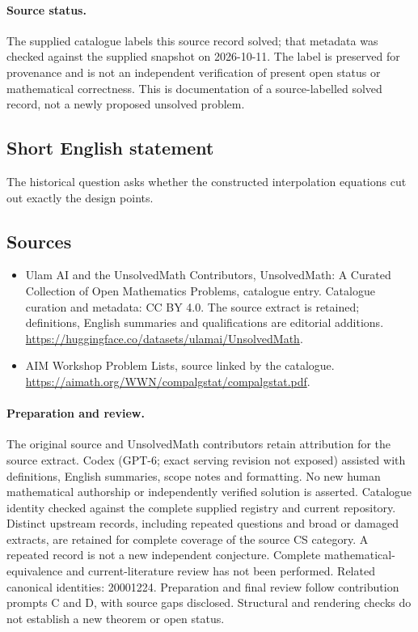 \documentclass[11pt]{article}
\begin{document}
\paragraph{Source status.}
The supplied catalogue labels this source record solved; that metadata was checked against the supplied snapshot on 2026-10-11. The label is preserved for provenance and is not an independent verification of present open status or mathematical correctness. This is documentation of a source-labelled solved record, not a newly proposed unsolved problem.
\subsection{Short English statement}
The historical question asks whether the constructed interpolation equations cut out exactly the design points.
\subsection{Sources}
\begin{itemize}
\item[\hypertarget{source:statement:1}{S1}] Ulam AI and the UnsolvedMath Contributors, UnsolvedMath: A Curated Collection of Open Mathematics Problems, catalogue entry. Catalogue curation and metadata: CC BY 4.0. The source extract is retained; definitions, English summaries and qualifications are editorial additions.
\url{https://huggingface.co/datasets/ulamai/UnsolvedMath}.
\item[\hypertarget{source:statement:2}{S2}] AIM Workshop Problem Lists, source linked by the catalogue.
\url{https://aimath.org/WWN/compalgstat/compalgstat.pdf}.
\end{itemize}
\paragraph{Preparation and review.}
The original source and UnsolvedMath contributors retain attribution for the source extract. Codex (GPT-6; exact serving revision not exposed) assisted with definitions, English summaries, scope notes and formatting. No new human mathematical authorship or independently verified solution is asserted. Catalogue identity checked against the complete supplied registry and current repository. Distinct upstream records, including repeated questions and broad or damaged extracts, are retained for complete coverage of the source CS category. A repeated record is not a new independent conjecture. Complete mathematical-equivalence and current-literature review has not been performed. Related canonical identities: 20001224. Preparation and final review follow contribution prompts C and D, with source gaps disclosed. Structural and rendering checks do not establish a new theorem or open status.
\label{end:statement}
\end{document}
